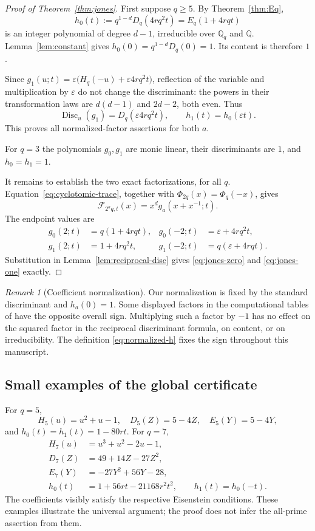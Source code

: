 \documentclass[11pt,a4paper]{article}
\theoremstyle{definition}
\theoremstyle{remark}
\newtheorem{remark}[theorem]{Remark}
\newcommand{\QQ}{\mathbb Q}
\newcommand{\Disc}{\operatorname{Disc}}
\begin{document}
\begin{proof}[Proof of Theorem~\ref{thm:jones}]
First suppose $q\ge5$. By Theorem~\ref{thm:Eq},
\[
 h_0(t):=q^{1-d}D_q(4rq^2t)=E_q(1+4rqt)
\]
is an integer polynomial of degree $d-1$, irreducible over
$\QQ_q$ and $\QQ$. Lemma~\ref{lem:constant} gives
$h_0(0)=q^{1-d}D_q(0)=1$. Its content is therefore $1$.

Since $g_1(u;t)=\varepsilon\bigl(H_q(-u)+\varepsilon4rq^2t\bigr)$,
reflection of the variable and multiplication by $\varepsilon$
do not change the discriminant: the powers in their transformation
laws are $d(d-1)$ and $2d-2$, both even. Thus
\[
 \Disc_u(g_1)=D_q(\varepsilon4rq^2t),\qquad
 h_1(t)=h_0(\varepsilon t).
\]
This proves all normalized-factor assertions for both $a$.

For $q=3$ the polynomials $g_0,g_1$ are monic linear, their
discriminants are $1$, and $h_0=h_1=1$.

It remains to establish the two exact factorizations, for all $q$.
Equation~\eqref{eq:cyclotomic-trace}, together with
$\Phi_{2q}(x)=\Phi_q(-x)$, gives
\[
 \mathcal F_{2^a q,t}(x)=x^dg_a(x+x^{-1};t).
\]
The endpoint values are
\begin{align*}
 g_0(2;t)&=q(1+4rqt),&g_0(-2;t)&=\varepsilon+4rq^2t,\\
 g_1(2;t)&=1+4rq^2t,&g_1(-2;t)&=q(\varepsilon+4rqt).
\end{align*}
Substitution in Lemma~\ref{lem:reciprocal-disc} gives
\eqref{eq:jones-zero} and \eqref{eq:jones-one} exactly.
\end{proof}

\begin{remark}[Coefficient normalization]
Our normalization is fixed by the standard discriminant and
$h_a(0)=1$. Some displayed factors in the computational tables
of \cite{Jones} have the opposite overall sign. Multiplying such
a factor by $-1$ has no effect on the squared factor in the reciprocal
discriminant formula, on content, or on irreducibility. The
definition \eqref{eq:normalized-h} fixes the sign throughout this
manuscript.
\end{remark}

\subsection{Small examples of the global certificate}

For $q=5$,
\[
 H_5(u)=u^2+u-1,\quad D_5(Z)=5-4Z,\quad E_5(Y)=5-4Y,
\]
and $h_0(t)=h_1(t)=1-80rt$.
For $q=7$,
\begin{align*}
 H_7(u)&=u^3+u^2-2u-1,\\
 D_7(Z)&=49+14Z-27Z^2,\\
 E_7(Y)&=-27Y^2+56Y-28,\\
 h_0(t)&=1+56rt-21168r^2t^2,\qquad h_1(t)=h_0(-t).
\end{align*}
The coefficients visibly satisfy the respective Eisenstein
conditions. These examples illustrate the universal argument;
the proof does not infer the all-prime assertion from them.
\end{document}
